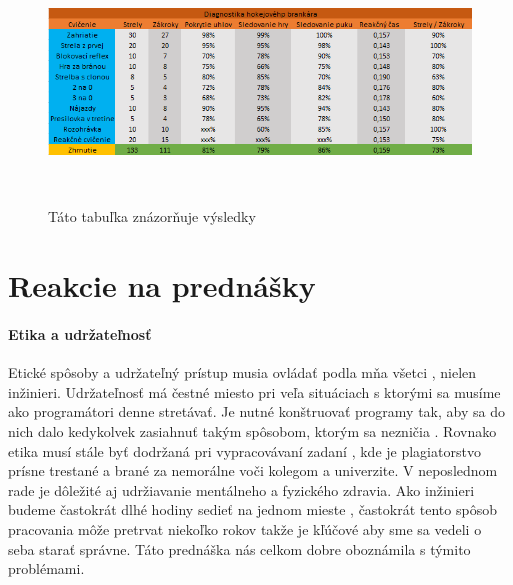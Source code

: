 \documentclass[10pt,twoside,slovak,a4paper]{article}										%
\begin{document}
\begin{figure}[htbp]
\centering
\includegraphics[scale=0.6]{tabulka.png}
\caption{Táto tabuľka znázorňuje výsledky }  ~\cite{Hlavny:zdroj}
\label{fig}
\end{figure}


%


\section{Reakcie na prednášky}

\paragraph{Etika a udržateľnosť } 
Etické spôsoby a udržateľný prístup musia ovládať podla mňa všetci , nielen inžinieri. Udržateľnosť má čestné miesto pri veľa situáciach s ktorými sa musíme ako programátori denne stretávať. Je nutné konštruovať programy tak, aby sa do nich dalo kedykolvek zasiahnuť takým spôsobom, ktorým sa nezničia . Rovnako etika musí stále byť dodržaná pri vypracovávaní zadaní , kde je plagiatorstvo prísne trestané a brané za nemorálne voči kolegom a univerzite. V neposlednom rade je dôležité aj udržiavanie mentálneho a fyzického zdravia. Ako inžinieri budeme častokrát dlhé hodiny sedieť na jednom mieste , častokrát tento spôsob pracovania môže pretrvat niekoľko rokov takže je kľúčové aby sme sa vedeli o seba starať správne. Táto prednáška nás celkom dobre oboznámila s týmito problémami.
\end{document}
